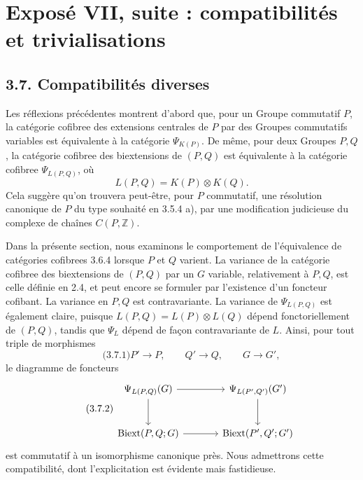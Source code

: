 \documentclass[11pt]{article}
\begin{document}
\section*{Exposé VII, suite : compatibilités et trivialisations}

\subsection*{3.7. Compatibilités diverses}

Les réflexions précédentes montrent d'abord que, pour un Groupe commutatif \(P\), la catégorie cofibree des extensions centrales de \(P\) par des Groupes commutatifs variables est équivalente à la catégorie \(\Psi_{K(P)}\).  De même, pour deux Groupes \(P,Q\), la catégorie cofibree des biextensions de \((P,Q)\) est équivalente à la catégorie cofibree \(\Psi_{L(P,Q)}\), où
\[
        L(P,Q)=K(P)\otimes K(Q).
\]
Cela suggère qu'on trouvera peut-être, pour \(P\) commutatif, une résolution canonique de \(P\) du type souhaité en 3.5.4 a), par une modification judicieuse du complexe de chaînes \(C(P,\mathbb Z)\).

Dans la présente section, nous examinons le comportement de l'équivalence de catégories cofibrees 3.6.4 lorsque \(P\) et \(Q\) varient.  La variance de la catégorie cofibree des biextensions de \((P,Q)\) par un \(G\) variable, relativement à \(P,Q\), est celle définie en 2.4, et peut encore se formuler par l'existence d'un foncteur cofibant.  La variance en \(P,Q\) est contravariante.  La variance de \(\Psi_{L(P,Q)}\) est également claire, puisque \(L(P,Q)=L(P)\otimes L(Q)\) dépend fonctoriellement de \((P,Q)\), tandis que \(\Psi_L\) dépend de façon contravariante de \(L\).  Ainsi, pour tout triple de morphismes
\begin{equation}\qquad\text{(3.7.1)}
        P'\to P,
        \qquad Q'\to Q,
        \qquad G\to G',
\end{equation}
le diagramme de foncteurs
\begin{equation}\qquad\text{(3.7.2)}
\begin{tikzcd}[column sep=large,row sep=large]
 \Psi_{L(P,Q)}(G) \arrow[r] \arrow[d] & \Psi_{L(P',Q')}(G') \arrow[d] \\
 \Biext(P,Q;G) \arrow[r] & \Biext(P',Q';G')
\end{tikzcd}
\end{equation}
est commutatif à un isomorphisme canonique près.  Nous admettrons cette compatibilité, dont l'explicitation est évidente mais fastidieuse.
\end{document}

